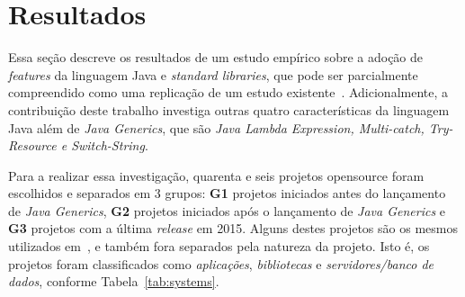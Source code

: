 \section{Resultados}\label{sec:resultados}

Essa se\c c\~{a}o descreve os resultados de 
um estudo emp\'{i}rico sobre a adoção de \textit{features} da 
linguagem Java e \textit{standard libraries}, que pode 
ser parcialmente compreendido como uma replicação de um estudo 
existente~\cite{Parnin:ACM2011}. Adicionalmente, a contribuição deste trabalho 
investiga outras quatro características da linguagem Java além de \textit{Java Generics}, 
que são \textit{Java Lambda Expression, Multi-catch, Try-Resource e Switch-String}.  



Para a realizar essa investigação, quarenta e seis projetos opensource foram escolhidos e separados em 3 
grupos: \textbf{G1} projetos iniciados antes do lançamento de \textit{Java Generics}, \textbf{G2} projetos iniciados 
após o lançamento de \textit{Java Generics} e \textbf{G3} projetos com a última \textit{release} em 2015. 
Alguns destes projetos são os mesmos utilizados em~\cite{Parnin:ACM2011, Dyer:ACM2014, ward2015performance}, 
e também fora separados pela natureza da projeto. Isto \'{e}, os projetos foram 
classificados como \emph{aplicações}, \emph{bibliotecas} e \emph{servidores/banco de dados}, 
conforme Tabela~\ref{tab:systems}. 

